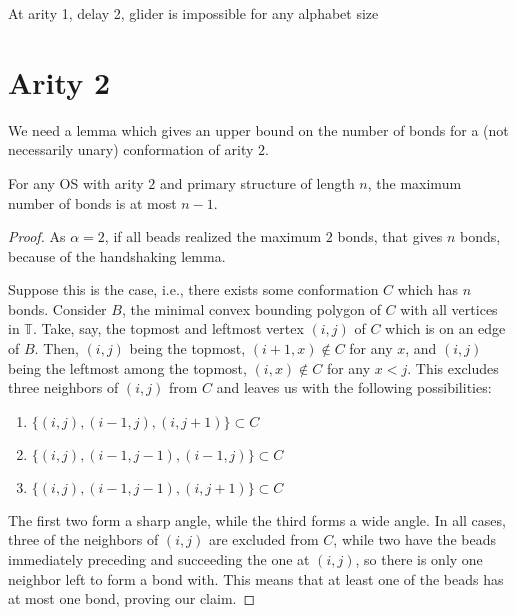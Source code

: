 \documentclass[]{llncs}
\newcommand{\red}{\color{red}}
\newcommand{\black}{\color{black}}
\begin{document}
\red
At arity 1, delay 2, glider is impossible for any alphabet size
%
\black




\section{Arity 2}
We need a lemma which gives an upper bound on the number of bonds for a (not necessarily unary) conformation of arity $2$.
\begin{lemma}
For any OS with arity $2$ and primary structure of length $n$, the maximum number of bonds is at most $n-1$.
\end{lemma}
\begin{proof}
As $\alpha=2$, if all beads realized the maximum $2$ bonds, that gives $n$ bonds, because of the handshaking lemma.

Suppose this is the case, i.e., there exists some conformation $C$ which has $n$ bonds. Consider $B$, the minimal convex bounding polygon of $C$ with all vertices in $\mathbb{T}$. Take, say, the topmost and leftmost vertex $(i,j)$ of $C$ which is on an edge of $B$. Then, $(i,j)$ being the topmost, $(i+1,x)\notin C$ for any $x$, and $(i,j)$ being the leftmost among the topmost, $(i,x)\notin C$ for any $x<j$. This excludes three neighbors of $(i,j)$ from $C$ and leaves us with the following possibilities:
\begin{enumerate}
\item $\{(i,j), (i-1,j), (i,j+1)\}\subset C$
\item $\{(i,j), (i-1,j-1), (i-1,j)\}\subset C$
\item $\{(i,j), (i-1,j-1), (i,j+1)\}\subset C$
\end{enumerate}
The first two form a sharp angle, while the third forms a wide angle. In all cases, three of the neighbors of $(i,j)$ are excluded from $C$, while two have the beads immediately preceding and succeeding the one at $(i,j)$, so there is only one neighbor left to form a bond with. This means that at least one of the beads has at most one bond, proving our claim.
\end{proof}
\end{document}
